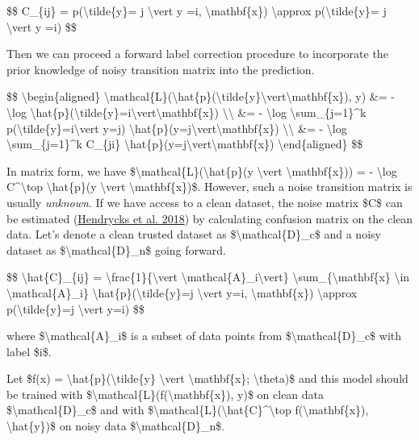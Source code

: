 \$\$ C\_\{ij\} = p(\textbackslash tilde\{y\}= j \textbackslash vert y =i, \textbackslash mathbf\{x\}) \textbackslash approx p(\textbackslash tilde\{y\}= j \textbackslash vert y =i) \$\$

Then we can proceed a forward label correction procedure to incorporate the prior knowledge of noisy transition matrix into the prediction.

\$\$ \textbackslash begin\{aligned\} \textbackslash mathcal\{L\}(\textbackslash hat\{p\}(\textbackslash tilde\{y\}\textbackslash vert\textbackslash mathbf\{x\}), y) \&= - \textbackslash log \textbackslash hat\{p\}(\textbackslash tilde\{y\}=i\textbackslash vert\textbackslash mathbf\{x\}) \textbackslash\textbackslash{} \&= - \textbackslash log \textbackslash sum\_\{j=1\}\^{}k p(\textbackslash tilde\{y\}=i\textbackslash vert y=j) \textbackslash hat\{p\}(y=j\textbackslash vert\textbackslash mathbf\{x\}) \textbackslash\textbackslash{} \&= - \textbackslash log \textbackslash sum\_\{j=1\}\^{}k C\_\{ji\} \textbackslash hat\{p\}(y=j\textbackslash vert\textbackslash mathbf\{x\}) \textbackslash end\{aligned\} \$\$

In matrix form, we have \$\textbackslash mathcal\{L\}(\textbackslash hat\{p\}(y \textbackslash vert \textbackslash mathbf\{x\})) = - \textbackslash log C\^{}\textbackslash top \textbackslash hat\{p\}(y \textbackslash vert \textbackslash mathbf\{x\})\$. However, such a noise transition matrix is usually \emph{unknown}. If we have access to a clean dataset, the noise matrix \$C\$ can be estimated (\href{https://arxiv.org/abs/1802.05300}{Hendrycks et al. 2018}) by calculating confusion matrix on the clean data. Let's denote a clean trusted dataset as \$\textbackslash mathcal\{D\}\_c\$ and a noisy dataset as \$\textbackslash mathcal\{D\}\_n\$ going forward.

\$\$ \textbackslash hat\{C\}\_\{ij\} = \textbackslash frac\{1\}\{\textbackslash vert \textbackslash mathcal\{A\}\_i\textbackslash vert\} \textbackslash sum\_\{\textbackslash mathbf\{x\} \textbackslash in \textbackslash mathcal\{A\}\_i\} \textbackslash hat\{p\}(\textbackslash tilde\{y\}=j \textbackslash vert y=i, \textbackslash mathbf\{x\}) \textbackslash approx p(\textbackslash tilde\{y\}=j \textbackslash vert y=i) \$\$

where \$\textbackslash mathcal\{A\}\_i\$ is a subset of data points from \$\textbackslash mathcal\{D\}\_c\$ with label \$i\$.

Let \$f(x) = \textbackslash hat\{p\}(\textbackslash tilde\{y\} \textbackslash vert \textbackslash mathbf\{x\}; \textbackslash theta)\$ and this model should be trained with \$\textbackslash mathcal\{L\}(f(\textbackslash mathbf\{x\}), y)\$ on clean data \$\textbackslash mathcal\{D\}\_c\$ and with \$\textbackslash mathcal\{L\}(\textbackslash hat\{C\}\^{}\textbackslash top f(\textbackslash mathbf\{x\}), \textbackslash hat\{y\})\$ on noisy data \$\textbackslash mathcal\{D\}\_n\$.

